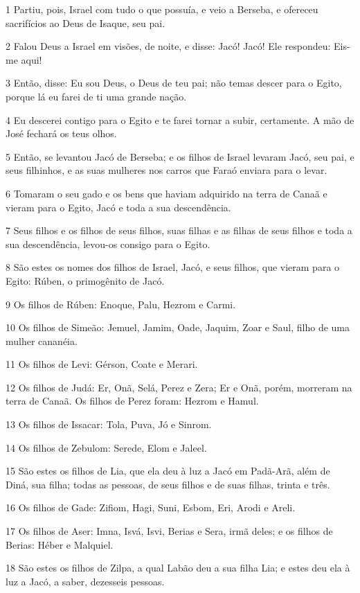 \par 1 Partiu, pois, Israel com tudo o que possuía, e veio a Berseba, e ofereceu sacrifícios ao Deus de Isaque, seu pai.
\par 2 Falou Deus a Israel em visões, de noite, e disse: Jacó! Jacó! Ele respondeu: Eis-me aqui!
\par 3 Então, disse: Eu sou Deus, o Deus de teu pai; não temas descer para o Egito, porque lá eu farei de ti uma grande nação.
\par 4 Eu descerei contigo para o Egito e te farei tornar a subir, certamente. A mão de José fechará os teus olhos.
\par 5 Então, se levantou Jacó de Berseba; e os filhos de Israel levaram Jacó, seu pai, e seus filhinhos, e as suas mulheres nos carros que Faraó enviara para o levar.
\par 6 Tomaram o seu gado e os bens que haviam adquirido na terra de Canaã e vieram para o Egito, Jacó e toda a sua descendência.
\par 7 Seus filhos e os filhos de seus filhos, suas filhas e as filhas de seus filhos e toda a sua descendência, levou-os consigo para o Egito.
\par 8 São estes os nomes dos filhos de Israel, Jacó, e seus filhos, que vieram para o Egito: Rúben, o primogênito de Jacó.
\par 9 Os filhos de Rúben: Enoque, Palu, Hezrom e Carmi.
\par 10 Os filhos de Simeão: Jemuel, Jamim, Oade, Jaquim, Zoar e Saul, filho de uma mulher cananéia.
\par 11 Os filhos de Levi: Gérson, Coate e Merari.
\par 12 Os filhos de Judá: Er, Onã, Selá, Perez e Zera; Er e Onã, porém, morreram na terra de Canaã. Os filhos de Perez foram: Hezrom e Hamul.
\par 13 Os filhos de Issacar: Tola, Puva, Jó e Sinrom.
\par 14 Os filhos de Zebulom: Serede, Elom e Jaleel.
\par 15 São estes os filhos de Lia, que ela deu à luz a Jacó em Padã-Arã, além de Diná, sua filha; todas as pessoas, de seus filhos e de suas filhas, trinta e três.
\par 16 Os filhos de Gade: Zifiom, Hagi, Suni, Esbom, Eri, Arodi e Areli.
\par 17 Os filhos de Aser: Imna, Isvá, Isvi, Berias e Sera, irmã deles; e os filhos de Berias: Héber e Malquiel.
\par 18 São estes os filhos de Zilpa, a qual Labão deu a sua filha Lia; e estes deu ela à luz a Jacó, a saber, dezesseis pessoas.
